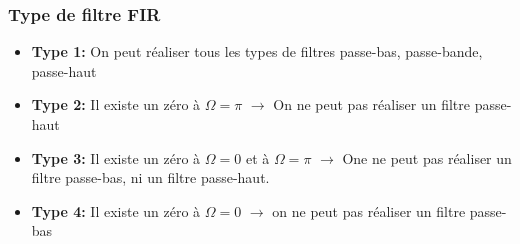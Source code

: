 \documentclass[9pt]{article}
\begin{document}
\begin{multicols}{3}
\subsubsection{Type de filtre FIR}
\begin{itemize}
    \item \textbf{Type 1:} On peut réaliser tous les types de filtres passe-bas, passe-bande, passe-haut
    \item \textbf{Type 2:} Il existe un zéro à $ \Omega = \pi  $ $\rightarrow$ On ne peut pas réaliser un filtre passe-haut
    \item \textbf{Type 3:} Il existe un zéro à $ \Omega = 0 $ et à $ \Omega = \pi  $ $\rightarrow$ One ne peut pas réaliser un filtre passe-bas, ni un filtre passe-haut.
    \item \textbf{Type 4:} Il existe un zéro à $ \Omega = 0 $ $\rightarrow$ on ne peut pas réaliser un filtre passe-bas
\end{itemize}
\end{multicols}
\end{document}
